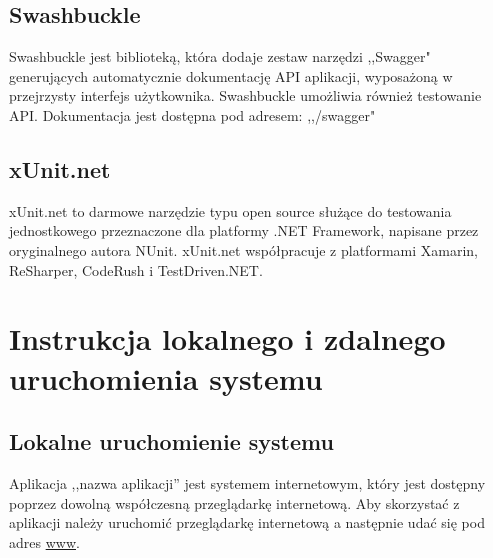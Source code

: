 \documentclass[12pt,a4paper]{article}
\begin{document}
		\subsection{Swashbuckle}
			\indent Swashbuckle jest biblioteką, która dodaje zestaw narzędzi ,,Swagger" generujących automatycznie dokumentację API aplikacji,
				wyposażoną w przejrzysty interfejs użytkownika. Swashbuckle umożliwia również testowanie API. Dokumentacja jest dostępna pod adresem: ,,/swagger"

		\subsection{xUnit.net}
			\indent xUnit.net to darmowe narzędzie typu open source służące do testowania jednostkowego
			przeznaczone dla platformy .NET Framework, napisane przez oryginalnego autora NUnit.
			xUnit.net współpracuje z platformami Xamarin, ReSharper, CodeRush i TestDriven.NET.
	
	\newpage
		
	\section{Instrukcja lokalnego i zdalnego uruchomienia systemu}
		\subsection{Lokalne uruchomienie systemu}
			\indent Aplikacja ,,nazwa aplikacji'' jest systemem internetowym, który jest dostępny
			poprzez dowolną współczesną przeglądarkę internetową. Aby skorzystać z aplikacji należy
			uruchomić przeglądarkę internetową a następnie udać się pod adres \url{www}.
			
\end{document}
